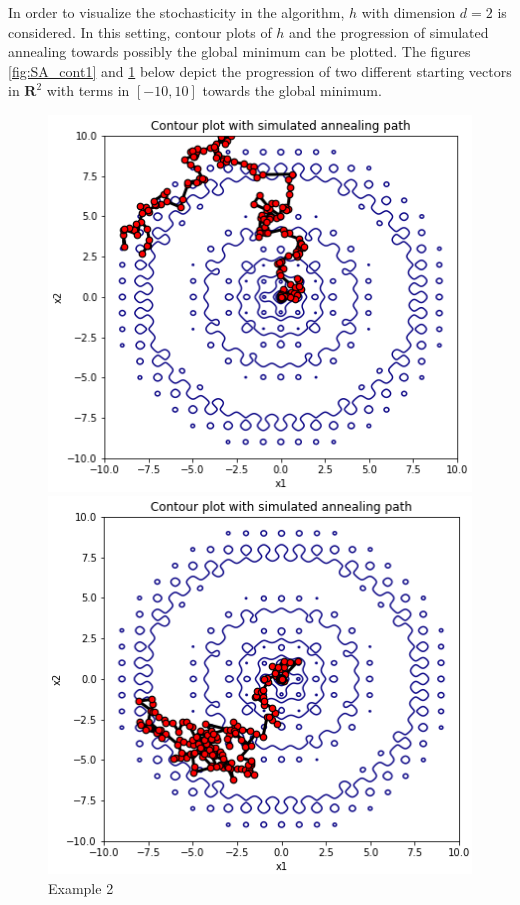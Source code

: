 In order to visualize the stochasticity in the algorithm, $h$ with dimension $d=2$ is considered. In this setting, contour plots of $h$ and the progression of simulated annealing towards possibly the global minimum can be plotted. The figures \ref{fig:SA_cont1} and \ref{fig:SA_cont2} below depict the progression of two different starting vectors in $\mathbf{R}^2$ with terms in $\left[-10, 10\right]$ towards the global minimum.
\begin{figure}[h]
    \centering
    \begin{minipage}[b][0.38\textwidth]{0.35\textwidth}
      \includegraphics[width=\textwidth]{Pictures/sa_convergence-ackley_contour11.png}
      \caption{Example 1}\label{fig:SA_cont1}
    \end{minipage}
    \hspace{0.05cm}
    \begin{minipage}[b][0.38\textwidth]{0.35\textwidth}
      \includegraphics[width=\textwidth]{Pictures/sa_convergence-ackley_contour18.png}
      \caption{Example 2}\label{fig:SA_cont2}
    \end{minipage}
\end{figure}
